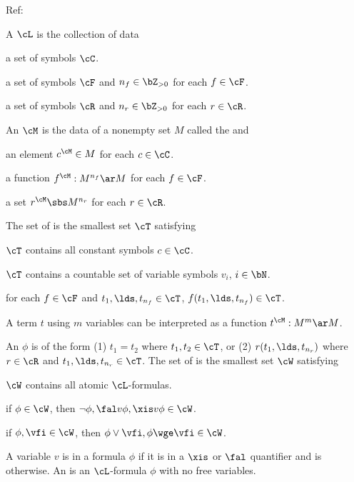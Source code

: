 \documentclass[article, a4paper, twoside]{universal}
\begin{document}
\confighead{}{}{}


Ref:~\cite{Marker2002}

\begin{dfn}
    A  $\cL$ is the collection of data
    \begin{itm}
    \item a set of  symbols $\cC$.
    \item a set of  symbols $\cF$ and $n_{f}\in\bZ_{>0}$ for each $f\in\cF$.
    \item a set of  symbols $\cR$ and $n_{r}\in\bZ_{>0}$ for each $r\in\cR$.
    \end{itm}
\end{dfn}

\begin{dfn}
    An  $\cM$ is the data of a nonempty set $M$ called the  and
    \begin{itm}
    \item an element $c^{\cM}\in M$ for each $c\in\cC$.
    \item a function $f^{\cM}:M^{n_f}\ar M$ for each $f\in\cF$.
    \item a set $r^{\cM}\sbs M^{n_r}$ for each $r\in\cR$.
    \end{itm}
\end{dfn}

\begin{dfn}
    The set of  is the smallest set $\cT$ satisfying
    \begin{itm}
    \item $\cT$ contains all constant symbols $c\in\cC$.
    \item $\cT$ contains a countable set of variable symbols $v_{i}$, $i\in\bN$.
    \item for each $f\in\cF$ and $t_{1},\lds,t_{n_{f}}\in\cT$, $f(t_{1},\lds,t_{n_{f}})\in\cT$.
    \end{itm}
    A term $t$ using $m$ variables can be interpreted as a function $t^{\cM}:M^{m}\ar M$.
\end{dfn}

\begin{dfn}
    An  $\phi$ is of the form (1) $t_{1}=t_{2}$ where $t_{1},t_{2}\in\cT$, or (2) $r(t_{1},\lds,t_{n_{r}})$ where $r\in\cR$ and $t_{1},\lds,t_{n_{r}}\in\cT$. The set of  is the smallest set $\cW$ satisfying
    \begin{itm}
    \item $\cW$ contains all atomic $\cL$-formulas.
    \item if $\phi\in\cW$, then $\neg\phi, \fal v\phi, \xis v\phi\in\cW$.
    \item if $\phi,\vfi\in\cW$, then $\phi\vee\vfi,\phi\wge\vfi\in\cW$.
    \end{itm}

    A variable $v$ is  in a formula $\phi$ if it is in a $\xis$ or $\fal$ quantifier and is  otherwise. An  is an $\cL$-formula $\phi$ with no free variables.
\end{dfn}
\end{document}
